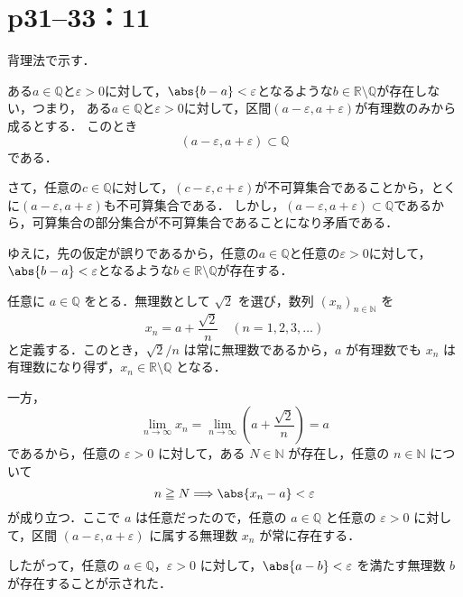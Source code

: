 \section*{p31--33：11}

\begin{tproof}
    背理法で示す．

    ある$ a\in \mathbb{Q}$と$\varepsilon >0$に対して，$\abs{b-a}<\varepsilon$となるような$b \in \mathbb{R} \setminus \mathbb{Q}$が存在しない，つまり，
    ある$a \in \mathbb{Q}$と$\varepsilon >0$に対して，区間$(a-\varepsilon , a+ \varepsilon)$が有理数のみから成るとする．
    このとき
    \[
        (a-\varepsilon , a+ \varepsilon) \subset \mathbb{Q}
    \]
    である．

    さて，任意の$ c \in \mathbb{Q}$に対して，$ (c-\varepsilon , c+ \varepsilon)$が不可算集合であることから，とくに$(a-\varepsilon , a+ \varepsilon)$も不可算集合である．
    しかし，$(a-\varepsilon , a+ \varepsilon) \subset \mathbb{Q}$であるから，可算集合の部分集合が不可算集合であることになり矛盾である．

    ゆえに，先の仮定が誤りであるから，任意の$ a\in \mathbb{Q}$と任意の$\varepsilon >0$に対して，$\abs{b-a}<\varepsilon$となるような$b \in \mathbb{R} \setminus \mathbb{Q}$が存在する．
\end{tproof}


\begin{tproof}
    [別解1]
    任意に $a \in \mathbb{Q}$ をとる．無理数として $\sqrt{2}$ を選び，数列 $(x_n)_{n \in \mathbb{N}}$ を
    \[
        x_n = a + \frac{\sqrt{2}}{n}\quad (n=1,2,3,\dots)
    \]
    と定義する．このとき，$\sqrt{2}/n$ は常に無理数であるから，$a$ が有理数でも $x_n$ は有理数になり得ず，$x_n \in \mathbb{R}\setminus\mathbb{Q}$ となる．

    一方，
    \[
        \lim_{n \to \infty} x_n=\lim_{n \to \infty} \left(a + \frac{\sqrt{2}}{n}\right)=a
    \]
    であるから，任意の $\varepsilon > 0$ に対して，ある $N \in \mathbb{N}$ が存在し，任意の $n \in \mathbb{N}$ について
    \[
        n \geqq N \Longrightarrow \abs{x_n - a} < \varepsilon
    \]
    が成り立つ．ここで $a$ は任意だったので，任意の $a \in \mathbb{Q}$ と任意の $\varepsilon > 0$ に対して，区間 $(a-\varepsilon, a+\varepsilon)$ に属する無理数 $x_n$ が常に存在する．

    したがって，任意の $a \in \mathbb{Q}$，$\varepsilon > 0$ に対して，$\abs{a-b}<\varepsilon$ を満たす無理数 $b$ が存在することが示された．
\end{tproof}


